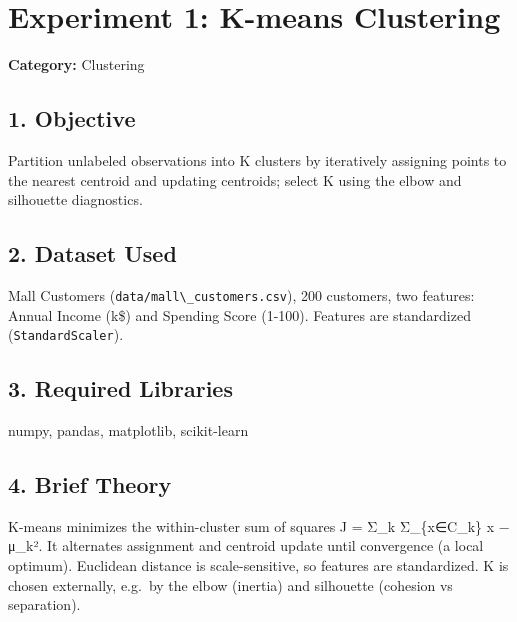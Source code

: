
\chapter{Experiment 1: K-means
Clustering}\label{experiment-1-k-means-clustering}

\textbf{Category:} Clustering

\section{1. Objective}\label{objective}

Partition unlabeled observations into K clusters by iteratively
assigning points to the nearest centroid and updating centroids; select
K using the elbow and silhouette diagnostics.

\section{2. Dataset Used}\label{dataset-used}

Mall Customers (\passthrough{\lstinline!data/mall\_customers.csv!}), 200
customers, two features: Annual Income (k\$) and Spending Score (1-100).
Features are standardized (\passthrough{\lstinline!StandardScaler!}).

\section{3. Required Libraries}\label{required-libraries}

numpy, pandas, matplotlib, scikit-learn

\section{4. Brief Theory}\label{brief-theory}

K-means minimizes the within-cluster sum of squares J = Σ\_k
Σ\_\{x∈C\_k\} \textbar\textbar x − μ\_k\textbar\textbar². It alternates
assignment and centroid update until convergence (a local optimum).
Euclidean distance is scale-sensitive, so features are standardized. K
is chosen externally, e.g.~by the elbow (inertia) and silhouette
(cohesion vs separation).

